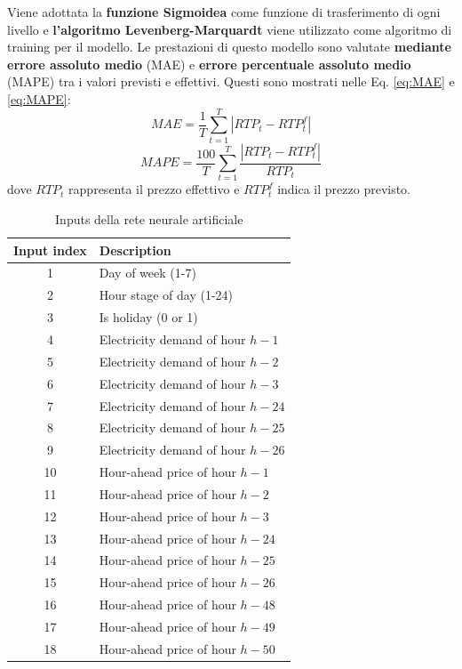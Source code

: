 \documentclass[italian, Lau, oneside]{sapthesis}
\begin{document}
Viene adottata la \textbf{funzione Sigmoidea} come funzione di trasferimento di ogni livello e \textbf{l'algoritmo Levenberg-Marquardt} viene utilizzato come algoritmo di training per il modello. Le prestazioni di questo modello sono valutate \textbf{mediante errore assoluto medio} (MAE) e \textbf{errore percentuale assoluto medio} (MAPE) tra i valori previsti e effettivi. Questi sono mostrati nelle Eq. \ref{eq:MAE} e \ref{eq:MAPE}:
\begin{equation}
\label{eq:MAE}
    MAE = \frac{1}{T} \sum^{T}_{t=1} \left| RTP_t - RTP^{f}_{t} \right|
\end{equation}
\begin{equation}
\label{eq:MAPE}
    MAPE = \frac{100}{T} \sum^{T}_{t=1} \frac{\left| RTP_t - RTP^{f}_{t} \right|}{RTP_t}
\end{equation}
dove $RTP_t$ rappresenta il prezzo effettivo e $RTP^{f}_{t}$ indica il prezzo previsto.

\begin{table}[h]
    \center
    \caption{Inputs della rete neurale artificiale}
    \label{tab:ANN}
    \begin{tabular}{c|l}
        \hline
        \hline
        Input index & Description \\
        \hline
        1 & Day of week (1-7) \\
        \hline
        2 & Hour stage of day (1-24) \\
        \hline
        3 & Is holiday (0 or 1) \\
        \hline
        4 & Electricity demand of hour $h-1$ \\
        \hline
        5 & Electricity demand of hour $h-2$ \\
        \hline
        6 & Electricity demand of hour $h-3$ \\
        \hline
        7 & Electricity demand of hour $h-24$ \\
        \hline
        8 & Electricity demand of hour $h-25$ \\
        \hline
        9 & Electricity demand of hour $h-26$ \\
        \hline
        10 & Hour-ahead price of hour $h-1$ \\
        \hline
        11 & Hour-ahead price of hour $h-2$ \\
        \hline
        12 & Hour-ahead price of hour $h-3$ \\
        \hline
        13 & Hour-ahead price of hour $h-24$ \\
        \hline
        14 & Hour-ahead price of hour $h-25$ \\
        \hline
        15 & Hour-ahead price of hour $h-26$ \\
        \hline
        16 & Hour-ahead price of hour $h-48$ \\
        \hline
        17 & Hour-ahead price of hour $h-49$ \\
        \hline
        18 & Hour-ahead price of hour $h-50$ \\
        \hline
        \hline
    \end{tabular}
\end{table}
\end{document}

